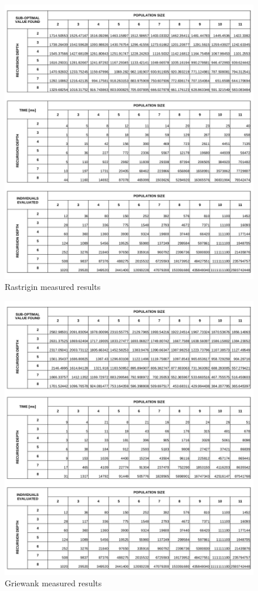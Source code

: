 \documentclass[graybox]{styles/svmult}
\begin{document}
\begin{figure}[b]
\sidecaption
\includegraphics[width=1.0\textwidth,height=0.45\textheight]{images/fig12}
\caption{Rastrigin measured results}
\label{fig:8}
\end{figure}

\begin{figure}[b]
\sidecaption
\includegraphics[width=1.0\textwidth,height=0.45\textheight]{images/fig13}
\caption{Griewank measured results}
\label{fig:9}
\end{figure}
\end{document}

